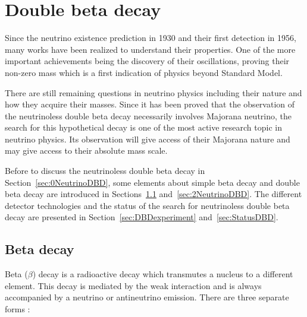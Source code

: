 \documentclass[main.tex]{subfiles}
\begin{document}
\chapter{Double beta decay}
 



\NI Since the neutrino existence prediction in 1930 and their first detection in 1956, many works have been realized to understand their properties. One of the more important achievements being the discovery of their oscillations, proving their non-zero mass which is a first indication of physics beyond Standard Model. 


\bigskip


\NI There are still remaining questions in neutrino physics including their nature and how they acquire their masses. Since it has been proved that the observation of the neutrinoless double beta decay necessarily involves Majorana neutrino, the search for this hypothetical decay is one of the most active research topic in neutrino physics. Its observation will give access of their Majorana nature and may give access to their absolute mass scale.


\bigskip


\NI Before to discuss the neutrinoless double beta decay in Section~\ref{sec:0NeutrinoDBD}, some elements about simple beta decay and double beta decay are introduced in Sections~\ref{sec:betaDecay} and~\ref{sec:2NeutrinoDBD}. The different detector technologies and the status of the search for neutrinoless double beta decay are presented in Section~\ref{sec:DBDexperiment} and~\ref{sec:StatusDBD}.


\section{Beta decay}\label{sec:betaDecay}


\NI Beta ($\beta$) decay is a radioactive decay which transmutes a nucleus to a different element. This decay is mediated by the weak interaction and is always accompanied by a neutrino or antineutrino emission. There are three separate forms :
\end{document}

